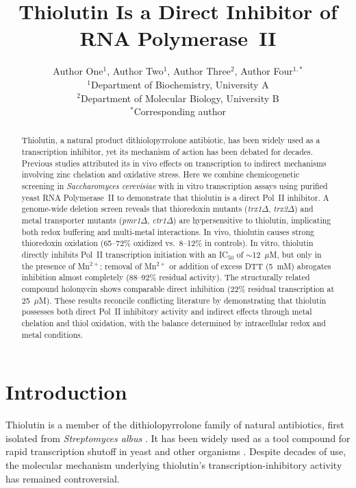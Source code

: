 \documentclass[11pt]{article}
\title{Thiolutin Is a Direct Inhibitor of RNA Polymerase~II}
\author{
  Author One$^{1}$, Author Two$^{1}$, Author Three$^{2}$, Author Four$^{1,*}$ \\
  $^{1}$Department of Biochemistry, University A \\
  $^{2}$Department of Molecular Biology, University B \\
  $^{*}$Corresponding author
}
\date{}
\begin{document}
\maketitle

\begin{abstract}
Thiolutin, a natural product dithiolopyrrolone antibiotic, has been widely used as a transcription inhibitor, yet its mechanism of action has been debated for decades. Previous studies attributed its in vivo effects on transcription to indirect mechanisms involving zinc chelation and oxidative stress. Here we combine chemicogenetic screening in \textit{Saccharomyces cerevisiae} with in vitro transcription assays using purified yeast RNA Polymerase~II to demonstrate that thiolutin is a direct Pol~II inhibitor. A genome-wide deletion screen reveals that thioredoxin mutants (\textit{trx1$\Delta$}, \textit{trx2$\Delta$}) and metal transporter mutants (\textit{pmr1$\Delta$}, \textit{ctr1$\Delta$}) are hypersensitive to thiolutin, implicating both redox buffering and multi-metal interactions. In vivo, thiolutin causes strong thioredoxin oxidation (65--72\% oxidized vs.\ 8--12\% in controls). In vitro, thiolutin directly inhibits Pol~II transcription initiation with an IC$_{50}$ of $\sim$12~$\mu$M, but only in the presence of Mn$^{2+}$; removal of Mn$^{2+}$ or addition of excess DTT (5~mM) abrogates inhibition almost completely (88--92\% residual activity). The structurally related compound holomycin shows comparable direct inhibition (22\% residual transcription at 25~$\mu$M). These results reconcile conflicting literature by demonstrating that thiolutin possesses both direct Pol~II inhibitory activity and indirect effects through metal chelation and thiol oxidation, with the balance determined by intracellular redox and metal conditions.
\end{abstract}

\section{Introduction}

Thiolutin is a member of the dithiolopyrrolone family of natural antibiotics, first isolated from \textit{Streptomyces albus} \citep{celmer1952}. It has been widely used as a tool compound for rapid transcription shutoff in yeast and other organisms \citep{jimenez1973,tipper1973}. Despite decades of use, the molecular mechanism underlying thiolutin's transcription-inhibitory activity has remained controversial.
\end{document}
